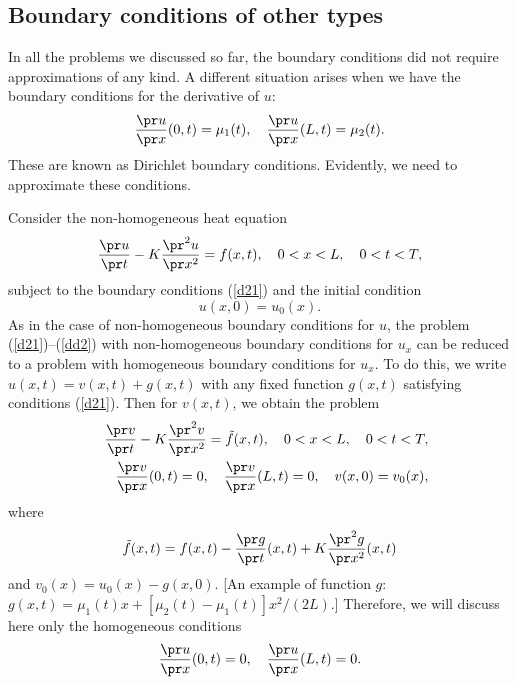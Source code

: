 
\subsection{Boundary conditions of other types}

 
In all the problems we discussed so far, the
boundary conditions did not require approximations of any kind.
A different situation arises when we have the boundary conditions for the derivative
of $u$:
\begin{equation}
\frac{\pr u}{\pr x}(0,t)=\mu_{1}(t), \quad
\frac{\pr u}{\pr x}(L,t)=\mu_{2}(t). \label{d21}
\end{equation}
These are known as Dirichlet boundary conditions.
Evidently, we need to approximate these conditions.
 
Consider the non-homogeneous heat equation
\begin{equation}
\frac{\pr u}{\pr t} - K\frac{\pr^{2} u}{\pr x^{2}}=f(x,t), \quad
0<x< L, \quad 0<t<T,   \label{dd1}
\end{equation}
subject to the boundary conditions (\ref{d21}) and the initial condition
\begin{equation}
u(x, 0) = u_{0}(x).   \label{dd2}
\end{equation}
As in the case of non-homogeneous boundary conditions for $u$, the problem
(\ref{d21})--(\ref{dd2}) with non-homogeneous boundary conditions for $u_{x}$
can be reduced to
a problem with homogeneous boundary conditions for $u_{x}$. To do this, we write
$u(x,t)=v(x,t)+g(x,t)$ with any fixed function $g(x,t)$ satisfying conditions
(\ref{d21}). Then for $v(x,t)$, we obtain the problem
\begin{eqnarray}
&&\frac{\pr v}{\pr t} - K\frac{\pr^{2} v}{\pr x^{2}}=\tilde{f}(x,t), \quad
0<x< L, \quad 0<t<T,   \nonumber \\
&&\frac{\pr v}{\pr x}(0,t)=0, \quad
\frac{\pr v}{\pr x}(L,t)=0, \quad
v(x, 0) = v_{0}(x), \nonumber
\end{eqnarray}
where 
$$\tilde{f}(x,t)=f(x,t)-\frac{\pr g}{\pr t}(x,t)+K\frac{\pr^2 g}{\pr x^2}(x,t)$$ 
and $v_{0}(x)=u_{0}(x)-g(x,0)$.
[An example of function $g$: $g(x,t)=\mu_{1}(t)x+[\mu_{2}(t)-\mu_{1}(t)]x^2/(2L)$.]
Therefore, we will discuss here only the homogeneous conditions
\begin{equation}
\frac{\pr u}{\pr x}(0,t)=0, \quad
\frac{\pr u}{\pr x}(L,t)=0. \label{d22}
\end{equation}

